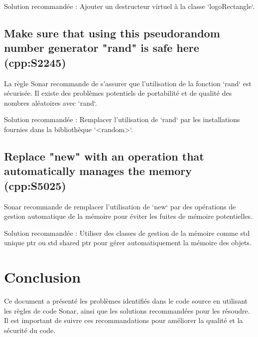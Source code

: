 \documentclass{article}
\begin{document}
Solution recommandée : Ajouter un destructeur virtuel à la classe `logoRectangle`.

\subsection{Make sure that using this pseudorandom number generator "rand" is safe here (cpp:S2245)}

La règle Sonar recommande de s'assurer que l'utilisation de la fonction `rand` est sécurisée. Il existe des problèmes potentiels de portabilité et de qualité des nombres aléatoires avec `rand`.

Solution recommandée : Remplacer l'utilisation de `rand` par les installations fournies dans la bibliothèque `<random>`.

\subsection{Replace "new" with an operation that automatically manages the memory (cpp:S5025)}

Sonar recommande de remplacer l'utilisation de `new` par des opérations de gestion automatique de la mémoire pour éviter les fuites de mémoire potentielles.

Solution recommandée : Utiliser des classes de gestion de la mémoire comme std unique ptr  ou std shared ptr  pour gérer automatiquement la mémoire des objets.

\section{Conclusion}

Ce document a présenté les problèmes identifiés dans le code source en utilisant les règles de code Sonar, ainsi que les solutions recommandées pour les résoudre. Il est important de suivre ces recommandations pour améliorer la qualité et la sécurité du code.
\end{document}
